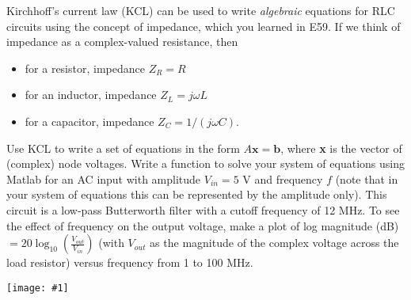 \documentclass[12pt,letterpaper]{hmcpset}
\newcommand{\diagram}[2]{\begin{center}\texttt{[image: \#1]}\end{center}}
\begin{document}
	
	
	\begin{problem}[1]
		Kirchhoff’s current law (KCL) can be used to write \textit{algebraic} equations for RLC circuits
		using the concept of impedance, which you learned in E59. If we think of impedance as a
		complex-valued resistance, then
		\begin{itemize}
			\item for a resistor, impedance $Z_R = R$
			
			\item for an inductor, impedance $Z_L = j\omega L$
			
			\item for a capacitor, impedance $Z_C = 1/(j\omega C)$.
		\end{itemize}
		Use KCL to write a set of equations in the form $A\textbf{x} = \textbf{b}$, where \textbf{x} is the vector of (complex)
		node voltages. Write a function to solve your system of equations using Matlab for an AC
		input with amplitude $V_{in} = 5$ V and frequency $f$ (note that in your system of equations this
		can be represented by the amplitude only). This circuit is a low-pass Butterworth filter with
		a cutoff frequency of 12 MHz. To see the effect of frequency on the output voltage, make
		a plot of log magnitude (dB) $= 20\log_{10}( \frac{V_{out}}{V_{in}} )$ (with $V_{out}$ as the magnitude of the complex
		voltage across the load resistor) versus frequency from 1 to 100 MHz.
		
		\diagram{1_Circuit}{5}
	\end{problem}
	
	\begin{solution}
		\vfill
	\end{solution}
	
\end{document}
